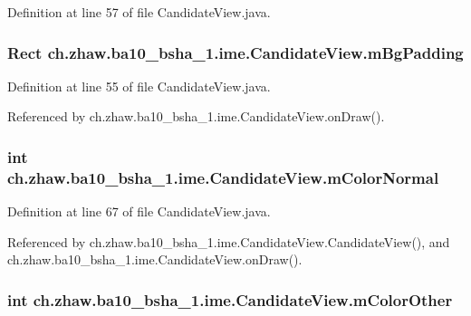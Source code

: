 Definition at line 57 of file CandidateView.java.\hypertarget{classch_1_1zhaw_1_1ba10__bsha__1_1_1ime_1_1CandidateView_afb3141192119d59855386a531991a9e0}{
\subsubsection[{mBgPadding}]{\setlength{\rightskip}{0pt plus 5cm}Rect {\bf ch.zhaw.ba10\_\-bsha\_\-1.ime.CandidateView.mBgPadding}}}
\label{classch_1_1zhaw_1_1ba10__bsha__1_1_1ime_1_1CandidateView_afb3141192119d59855386a531991a9e0}


Definition at line 55 of file CandidateView.java.

Referenced by ch.zhaw.ba10\_\-bsha\_\-1.ime.CandidateView.onDraw().\hypertarget{classch_1_1zhaw_1_1ba10__bsha__1_1_1ime_1_1CandidateView_a45fdde0e6a7cdb8fb7fbde1ef1c6d30f}{
\subsubsection[{mColorNormal}]{\setlength{\rightskip}{0pt plus 5cm}int {\bf ch.zhaw.ba10\_\-bsha\_\-1.ime.CandidateView.mColorNormal}}}
\label{classch_1_1zhaw_1_1ba10__bsha__1_1_1ime_1_1CandidateView_a45fdde0e6a7cdb8fb7fbde1ef1c6d30f}


Definition at line 67 of file CandidateView.java.

Referenced by ch.zhaw.ba10\_\-bsha\_\-1.ime.CandidateView.CandidateView(), and ch.zhaw.ba10\_\-bsha\_\-1.ime.CandidateView.onDraw().\hypertarget{classch_1_1zhaw_1_1ba10__bsha__1_1_1ime_1_1CandidateView_aceb46ae8e260d54fc447132586fe690d}{
\subsubsection[{mColorOther}]{\setlength{\rightskip}{0pt plus 5cm}int {\bf ch.zhaw.ba10\_\-bsha\_\-1.ime.CandidateView.mColorOther}}}
\label{classch_1_1zhaw_1_1ba10__bsha__1_1_1ime_1_1CandidateView_aceb46ae8e260d54fc447132586fe690d}


